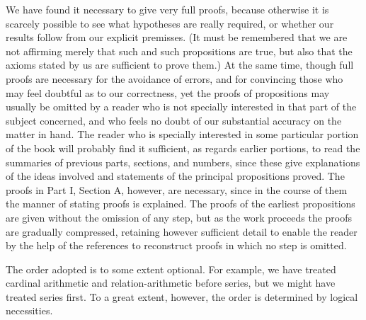 \documentclass[letterpaper,12pt,openany,leqno]{book}
\newcommand{\pagefirst}[1]{\marginnote[\boxed{\text{#1}}]{\boxed{\text{#1}}}}
\begin{document}
We have found it necessary to give very full proofs, because otherwise it is scarcely possible to see what hypotheses are really required, or whether \pagefirst{vii} our results follow from our explicit premisses. (It must be remembered that we are not affirming merely that such and such propositions are true, but also that the axioms stated by us are sufficient to prove them.) At the same time, though full proofs are necessary for the avoidance of errors, and for convincing those who may feel doubtful as to our correctness, yet the proofs of propositions may usually be omitted by a reader who is not specially interested in that part of the subject concerned, and who feels no doubt of our substantial accuracy on the matter in hand. The reader who is specially interested in some particular portion of the book will probably find it sufficient, as regards earlier portions, to read the summaries of previous parts, sections, and numbers, since these give explanations of the ideas involved and statements of the principal propositions proved. The proofs in Part I, Section A, however, are necessary, since in the course of them the manner of stating proofs is explained. The proofs of the earliest propositions are given without the omission of any step, but as the work proceeds the proofs are gradually compressed, retaining however sufficient detail to enable the reader by the help of the references to reconstruct proofs in which no step is omitted.

The order adopted is to some extent optional. For example, we have treated cardinal arithmetic and relation-arithmetic before series, but we might have treated series first. To a great extent, however, the order is determined by logical necessities.
\end{document}
